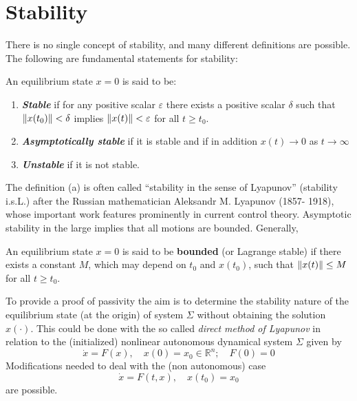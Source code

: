 \section{Stability}
There is no single concept of stability, and many different definitions are possible.
The following are fundamental statements for stability:
\begin{definition}
	An equilibrium state $x=0$ is said to be:
	\begin{enumerate}[label=(\alph*)]
		\item \emph{\textbf{Stable}} if for any positive scalar $\varepsilon$ there exists a positive scalar $\delta$ such that $\left\lVert x(t_{0})\right\rVert < \delta$ implies $\left\lVert x(t)\right\rVert < \varepsilon$ for all $t \geq t_{0}$.
		\item \emph{\textbf{Asymptotically stable}} if it is stable and if in addition $x(t) \rightarrow 0$ as $t \rightarrow \infty$
		\item \emph{\textbf{Unstable}} if it is not stable.
	\end{enumerate}
\end{definition}
The definition (a) is often called “stability in the sense of Lyapunov” (stability i.s.L.) after the Russian mathematician Aleksandr M. Lyapunov (1857- 1918), whose important work features prominently in current control theory.
Asymptotic stability in the large implies that all motions are bounded.
Generally,
\begin{definition}
	An equilibrium state $x=0$ is said to be \textbf{bounded} (or Lagrange stable) if there exists a constant $M$, which may depend on $t_{0}$ and $x(t_{0})$, such that $\left\lVert x(t)\right\rVert \leq M$ for all $t \geq t_{0}$.
\end{definition}

To provide a proof of passivity the aim is to determine the stability nature of the equilibrium state (at the origin) of system $\varSigma$ without obtaining the solution $x(\cdotp)$.
This could be done with the so called \textit{direct method of Lyapunov} in relation to the (initialized) nonlinear autonomous dynamical system
$\varSigma$ given by
\begin{equation}\label{Lyapunov_system}
	\dot{x} =F(x),\quad x(0)=x_{0} \in \mathbb{R}^{n}; \quad F(0)=0 
\end{equation} 
Modifications needed to deal with the (non autonomous) case 
\[ \dot{x}  = F ( t , x ) , \quad x ( t_{0} ) = x_{0} \]
are possible.

